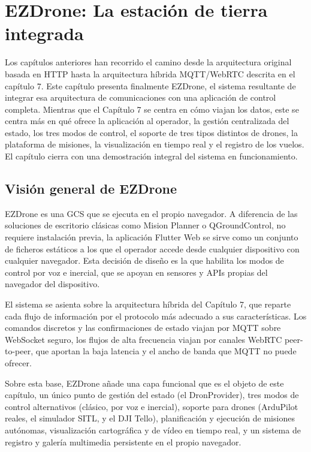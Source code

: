 \chapter{EZDrone: La estación de tierra integrada}
Los capítulos anteriores han recorrido el camino desde la arquitectura original basada en HTTP hasta la arquitectura híbrida MQTT/WebRTC descrita en el capítulo 7. Este capítulo presenta finalmente EZDrone, el sistema resultante de integrar esa arquitectura de comunicaciones con una aplicación de control completa. Mientras que el Capítulo 7 se centra en cómo viajan los datos, este se centra más en qué ofrece la aplicación al operador, la gestión centralizada del estado, los tres modos de control, el soporte de tres tipos distintos de drones, la plataforma de misiones, la visualización en tiempo real y el registro de los vuelos. El capítulo cierra con una demostración integral del sistema en funcionamiento.

\section{Visión general de EZDrone}
EZDrone es una GCS que se ejecuta en el propio navegador. A diferencia de las soluciones de escritorio clásicas como Mision Planner o QGroundControl, no requiere instalación previa, la aplicación Flutter Web se sirve como un conjunto de ficheros estáticos a los que el operador accede desde cualquier dispositivo con cualquier navegador. Esta decisión de diseño es la que habilita los modos de control por voz e inercial, que se apoyan en sensores y APIs propias del navegador del dispositivo.

El sistema se asienta sobre la arquitectura híbrida del Capítulo 7, que reparte cada flujo de información por el protocolo más adecuado a sus características. Los comandos discretos y las confirmaciones de estado viajan por MQTT sobre WebSocket seguro, los flujos de alta frecuencia viajan por canales WebRTC peer-to-peer, que aportan la baja latencia y el ancho de banda que MQTT no puede ofrecer. 

Sobre esta base, EZDrone añade una capa funcional que es el objeto de este capítulo, un único punto de gestión del estado (el DronProvider), tres modos de control alternativos (clásico, por voz e inercial), soporte para drones (ArduPilot reales, el simulador SITL, y el DJI Tello), planificación y ejecución de misiones autónomas, visualización cartográfica y de vídeo en tiempo real, y un sistema de registro y galería multimedia persistente en el propio navegador.

